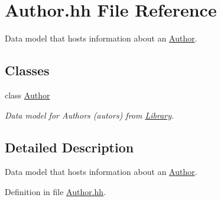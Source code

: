 \hypertarget{_author_8hh}{\section{Author.\-hh File Reference}
\label{_author_8hh}
}


Data model that hosts information about an \hyperlink{class_author}{Author}.  


\subsection*{Classes}
\begin{DoxyCompactItemize}
\item 
class \hyperlink{class_author}{Author}
\begin{DoxyCompactList}\small\item\em Data model for Authors (autors) from \hyperlink{class_library}{Library}. \end{DoxyCompactList}\end{DoxyCompactItemize}


\subsection{Detailed Description}
Data model that hosts information about an \hyperlink{class_author}{Author}. 

Definition in file \hyperlink{_author_8hh_source}{Author.\-hh}.

